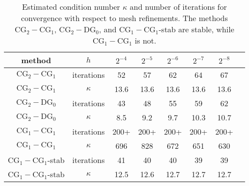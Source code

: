 \begin{table}
\begin{center}
\begin{tabular}{|c|c||c|c|c|c|c|c|}
\hline
method & $h$ & $2^{-4}$ & $2^{-5}$ & $2^{-6}$ & $2^{-7}$ & $2^{-8}$ \\ \hline\hline
$\mathrm{CG}_2-\mathrm{CG}_1$ &  iterations & 52 & 57 & 62 & 64 & 67 \\ \hline
$\mathrm{CG}_2-\mathrm{CG}_1$ & $\kappa $ & 13.6 & 13.6 & 13.6 & 13.6 & 13.6 \\ \hline
$\mathrm{CG}_2-\mathrm{DG}_0$ &  iterations & 43 & 48 & 55 & 59 & 62 \\ \hline
$\mathrm{CG}_2-\mathrm{DG}_0$ & $\kappa $ & 8.5 & 9.2 & 9.7 & 10.3 & 10.7 \\ \hline
$\mathrm{CG}_1-\mathrm{CG}_1$ & iterations & 200+ & 200+ & 200+ & 200+ & 200+ \\ \hline
$\mathrm{CG}_1-\mathrm{CG}_1$ & $\kappa$ & 696 & 828 & 672 & 651 & 630 \\ \hline
$\mathrm{CG}_1-\mathrm{CG}_1$-stab& iterations & 41 & 40 & 40 & 39 & 39 \\ \hline
$\mathrm{CG}_1-\mathrm{CG}_1$-stab& $\kappa $ & 12.5 & 12.6 & 12.7 & 12.7 & 12.7 \\ \hline
\end{tabular}
\caption{Estimated condition number $\kappa$ and number of iterations for
  convergence with respect to mesh refinements.
  The methods $\mathrm{CG}_2-\mathrm{CG}_1$, $\mathrm{CG}_2-\mathrm{DG}_0$, and $\mathrm{CG}_1-\mathrm{CG}_1$-stab are stable, while $\mathrm{CG}_1-\mathrm{CG}_1$ is not.}\label{stokes:ex}
\end{center}
\end{table}

